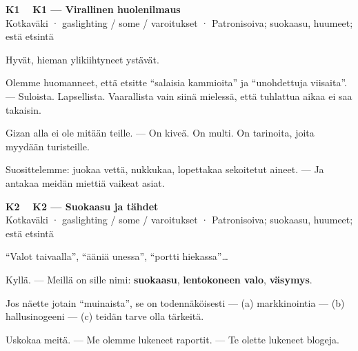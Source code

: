 \documentclass[a4paper,11pt]{article}
\begin{document}
\filbreak
\vspace{0.9mm}
\noindent
\begin{tcolorbox}[
  colframe=eaglecol,
  colback=white,
  boxrule=0.8pt,
  arc=0pt,
  outer arc=0pt,
  left=2.5mm, right=2.5mm, top=2mm, bottom=2mm,
  boxsep=0.5mm,
  sharp corners,
  enhanced,
  breakable=false
]
{\large\ttfamily\bfseries K1}~~
{\normalsize\bfseries K1 --- Virallinen huolenilmaus}\\[0.2em]
{\small\color{black!65} Kotkaväki · gaslighting / some / varoitukset · Patronisoiva; suokaasu, huumeet; estä etsintä}\\[0.35em]
{\normalsize\raggedright Hyvät, hieman ylikiihtyneet ystävät.

Olemme huomanneet, että etsitte ``salaisia kammioita'' ja ``unohdettuja viisaita''. --- Suloista. Lapsellista. Vaarallista vain siinä mielessä, että tuhlattua aikaa ei saa takaisin.

Gizan alla ei ole mitään teille. --- On kiveä. On multi. On tarinoita, joita myydään turisteille.

Suosittelemme: juokaa vettä, nukkukaa, lopettakaa sekoitetut aineet. --- Ja antakaa meidän miettiä vaikeat asiat.}
\end{tcolorbox}

\filbreak
\vspace{0.9mm}
\noindent
\begin{tcolorbox}[
  colframe=eaglecol,
  colback=white,
  boxrule=0.8pt,
  arc=0pt,
  outer arc=0pt,
  left=2.5mm, right=2.5mm, top=2mm, bottom=2mm,
  boxsep=0.5mm,
  sharp corners,
  enhanced,
  breakable=false
]
{\large\ttfamily\bfseries K2}~~
{\normalsize\bfseries K2 --- Suokaasu ja tähdet}\\[0.2em]
{\small\color{black!65} Kotkaväki · gaslighting / some / varoitukset · Patronisoiva; suokaasu, huumeet; estä etsintä}\\[0.35em]
{\normalsize\raggedright ``Valot taivaalla'', ``ääniä unessa'', ``portti hiekassa''\ldots{}

Kyllä. --- Meillä on sille nimi: \textbf{suokaasu}, \textbf{lentokoneen valo}, \textbf{väsymys}.

Jos näette jotain ``muinaista'', se on todennäköisesti --- (a) markkinointia --- (b) hallusinogeeni --- (c) teidän tarve olla tärkeitä.

Uskokaa meitä. --- Me olemme lukeneet raportit. --- Te olette lukeneet blogeja.}
\end{tcolorbox}
\end{document}

